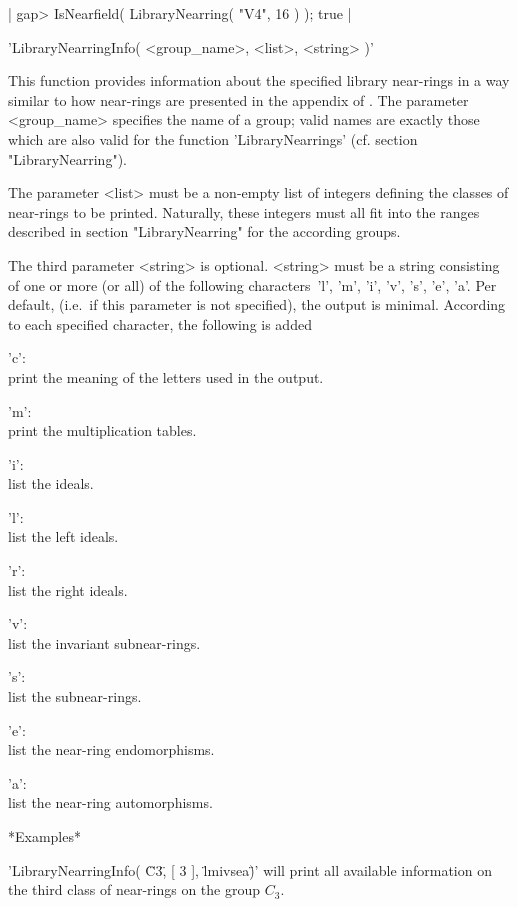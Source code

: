 |  gap> IsNearfield( LibraryNearring( "V4", 16 ) );     
  true
|

   
'LibraryNearringInfo( <group\_name>, <list>, <string> )'  

This function provides information about the specified library near-rings
in a way similar to how near-rings are presented in the appendix of
\cite{Pil83}.
The parameter <group\_name> specifies the name of a group; valid
names are exactly those which are also valid for the function
'Library\-Near\-rings' (cf. section "LibraryNearring"). 

The parameter <list> must be a non-empty list of integers defining the 
classes of near-rings to be printed. Naturally, these integers must all fit 
into the ranges described in section "LibraryNearring" for the according 
groups.

The third parameter <string> is optional. <string> must be a string
consisting of one or more (or all) of the following characters\:\
'l', 'm', 'i', 'v', 's', 'e', 'a'.
Per default, (i.e.\ if this parameter is not specified), the output is 
minimal. According to each specified character, the following is added\:\

  'c': \\
       print the meaning of the letters used in the output.

  'm': \\
       print the multiplication tables.

  'i': \\
       list the ideals.

  'l': \\
       list the left ideals.

  'r': \\
       list the right ideals.

  'v': \\
       list the invariant subnear-rings.

  's': \\
       list the subnear-rings.

  'e': \\
       list the near-ring endomorphisms.

  'a': \\
       list the near-ring automorphisms.


*Examples\:*\

'LibraryNearringInfo( \"C3\", [ 3 ], \"lmivsea\" )' will print all
available in\-for\-ma\-tion on the third class of near-\-rings on the 
group
$C_3$.

